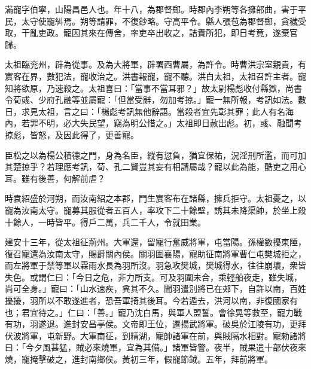 
\begin{pinyinscope}
滿寵字伯寧，山陽昌邑人也。年十八，為郡督郵。時郡內李朔等各擁部曲，害于平民，太守使寵糾焉。朔等請罪，不復鈔略。守高平令。縣人張苞為郡督郵，貪穢受取，干亂吏政。寵因其來在傳舍，率吏卒出收之，詰責所犯，即日考竟，遂棄官歸。

太祖臨兖州，辟為從事。及為大將軍，辟署西曹屬，為許令。時曹洪宗室親貴，有賔客在界，數犯法，寵收治之。洪書報寵，寵不聽。洪白太祖，太祖召許主者。寵知將欲原，乃速殺之。太祖喜曰：「當事不當耳邪？」故太尉楊彪收付縣獄，尚書令荀彧、少府孔融等並屬寵：「但當受辭，勿加考掠。」寵一無所報，考訊如法。數日，求見太祖，言之曰：「楊彪考訊無他辭語。當殺者宜先彰其罪；此人有名海內，若罪不明，必大失民望，竊為明公惜之。」太祖即日赦出彪。初，彧、融聞考掠彪，皆怒，及因此得了，更善寵。

臣松之以為楊公積德之門，身為名臣，縱有愆負，猶宜保祐，況淫刑所濫，而可加其楚掠乎？若理應考訊，荀、孔二賢豈其妄有相請屬哉？寵以此為能，酷吏之用心耳。雖有後善，何解前虐？

時袁紹盛於河朔，而汝南紹之本郡，門生賔客布在諸縣，擁兵拒守。太祖憂之，以寵為汝南太守。寵募其服從者五百人，率攻下二十餘壁，誘其未降渠帥，於坐上殺十餘人，一時皆平。得戶二萬，兵二千人，令就田業。

建安十三年，從太祖征荊州。大軍還，留寵行奮威將軍，屯當陽。孫權數擾東陲，復召寵還為汝南太守，賜爵關內侯。關羽圍襄陽，寵助征南將軍曹仁屯樊城拒之，而左將軍于禁等軍以霖雨水長為羽所沒。羽急攻樊城，樊城得水，往往崩壞，衆皆失色。或謂仁曰：「今日之危，非力所支。可及羽圍未合，乘輕船夜走，雖失城，尚可全身。」寵曰：「山水速疾，兾其不久。聞羽遣別將已在郟下，自許以南，百姓擾擾，羽所以不敢遂進者，恐吾軍掎其後耳。今若遁去，洪河以南，非復國家有也；君宜待之。」仁曰：「善。」寵乃沈白馬，與軍人盟誓。會徐晃等救至，寵力戰有功，羽遂退。進封安昌亭侯。文帝即王位，遷揚武將軍。破吳於江陵有功，更拜伏波將軍，屯新野。大軍南征，到精湖，寵帥諸軍在前，與賊隔水相對。寵勑諸將曰：「今夕風甚猛，賊必來燒軍，宜為其備。」諸軍皆警。夜半，賊果遣十部伏夜來燒，寵掩擊破之，進封南鄉侯。黃初三年，假寵節鉞。五年，拜前將軍。


\end{pinyinscope}
